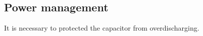 \subsection{Power management}
It is necessary to protected the capacitor from overdischarging.





